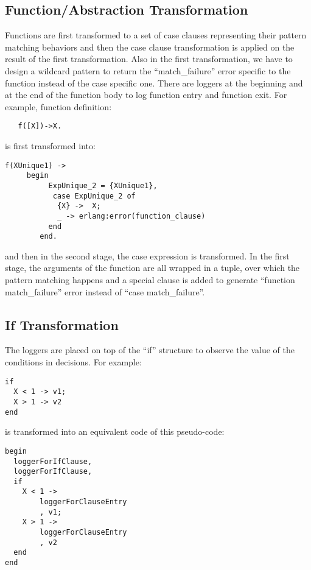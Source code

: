 \documentclass[12pt,a4paper]{report}
\begin{document}
\subsection{Function/Abstraction Transformation}
Functions are first transformed to a set of case clauses representing their pattern matching behaviors and then the case clause transformation is applied on the result of the first transformation. Also in the first transformation, we have to design a wildcard pattern to return the ``match\_failure'' error specific to the function instead of the case specific one. There are loggers at the beginning and at the end of the function body to log function entry and function exit. For example, function definition:

\begin{lstlisting}
   f([X])->X.
\end{lstlisting}

is first transformed into:

\begin{lstlisting}
f(XUnique1) ->
     begin
          ExpUnique_2 = {XUnique1},
           case ExpUnique_2 of
            {X} ->  X;
            _ -> erlang:error(function_clause)
          end
        end.
\end{lstlisting}

and then in the second stage, the case expression is transformed. In the first stage, the arguments of the function are all wrapped in a tuple, over which the pattern matching happens and a special clause is added to generate ``function match\_failure'' error instead of ``case match\_failure''.

\subsection{If Transformation}
The loggers are placed on top of the ``if'' structure to observe the value of the conditions in decisions. For example:

\begin{lstlisting}
if 
  X < 1 -> v1;
  X > 1 -> v2
end 
\end{lstlisting}

is transformed into an equivalent code of this pseudo-code:

\begin{lstlisting}
begin
  loggerForIfClause,
  loggerForIfClause,  
  if 
    X < 1 ->
	    loggerForClauseEntry
	    , v1;
    X > 1 ->
	    loggerForClauseEntry
	    , v2
  end
end 
\end{lstlisting}
\end{document}
